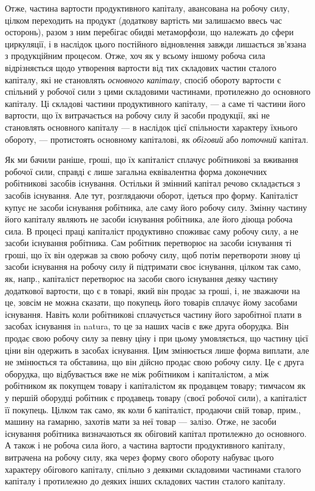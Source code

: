 \roztyagnut
Отже, частина вартости продуктивного капіталу, авансована на робочу силу, цілком переходить на
продукт (додаткову вартість ми залишаємо ввесь час осторонь), разом з ним перебігає обидві
метаморфози, що належать до сфери циркуляції, і в наслідок цього постійного відновлення завжди
лишається зв’язана з продукційним процесом. Отже, хоч як у всьому іншому робоча сила відрізняється
щодо утворення вартости від тих складових частин сталого капіталу, які не становлять \emph{основного}
\emph{капіталу}, спосіб обороту вартости є спільний у робочої сили з цими складовими частинами,
протилежно до основного капіталу. Ці складові частини продуктивного капіталу, — а саме ті частини
його вартости, що їх витрачається на робочу силу й засоби продукції, які не становлять основного
капіталу — в наслідок цієї спільности характеру їхнього обороту, — протистоять основному капіталові,
як \emph{обіговий} або \emph{поточний} капітал.

Як ми бачили раніше, гроші, що їх капіталіст сплачує робітникові за вживання робочої сили, справді є
лише загальна еквівалентна форма доконечних робітникові засобів існування. Остільки й змінний
капітал речово складається з засобів існування. Але тут, розглядаючи оборот, ідеться про форму.
Капіталіст купує не засоби існування робітника, але саму його робочу силу. Змінну частину його
капіталу являють не засоби існування робітника, але його діюща робоча сила. В процесі праці
капіталіст продуктивно споживає саму робочу силу, а не засоби існування робітника. Сам робітник
перетворює на засоби існування ті гроші, що їх він одержав за свою робочу силу, щоб потім
перетвороти знову ці засоби існування на робочу силу й підтримати своє існування, цілком так само,
як, напр., капіталіст перетворює на засоби свого існування деяку частину додаткової вартости, що є в
товарі, який він продає за гроші, і, не зважаючи на це, зовсім не можна сказати, що покупець його
товарів сплачує йому засобами існування. Навіть коли робітникові сплачується частину його заробітної
плати в засобах існування in natura, то це за наших часів є вже друга оборудка. Він продає свою
робочу силу за певну ціну і при цьому умовляється, що частину цієї ціни він одержить в засобах
існування. Цим змінюється лише форма виплати, але не змінюється та обставина, що він дійсно продає
свою робочу силу. Це є друга оборудка, що відбувається вже не між робітником і капіталістом, а між
робітником як покупцем товару і капіталістом як продавцем товару; тимчасом як у першій оборудці
робітник є продавець товару (своєї робочої сили), а капіталіст її покупець. Цілком так само, як коли
б капіталіст, продаючи свій товар, прим., машину на гамарню, захотів мати за неї товар — залізо.
Отже, не засоби існування робітника визначаються як обіговий капітал протилежно до основного. А
також і не робоча сила його, а частина вартости продуктивного капіталу, витрачена на робочу силу,
яка через форму свого обороту набуває цього характеру обігового капіталу, спільно з деякими
складовими частинами сталого капіталу і протилежно до деяких інших складових частин сталого
капіталу.

